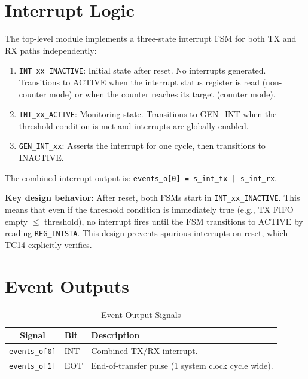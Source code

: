 \section{Interrupt Logic}

The top-level module implements a three-state interrupt FSM for both TX and RX paths independently:
\begin{enumerate}[leftmargin=2em]
  \item \texttt{INT\_xx\_INACTIVE}: Initial state after reset. No interrupts generated. Transitions
        to ACTIVE when the interrupt status register is read (non-counter mode) or when the
        counter reaches its target (counter mode).
  \item \texttt{INT\_xx\_ACTIVE}: Monitoring state. Transitions to GEN\_INT when the threshold
        condition is met and interrupts are globally enabled.
  \item \texttt{GEN\_INT\_xx}: Asserts the interrupt for one cycle, then transitions to INACTIVE.
\end{enumerate}

The combined interrupt output is: \texttt{events\_o[0] = s\_int\_tx | s\_int\_rx}.

\textbf{Key design behavior:} After reset, both FSMs start in \texttt{INT\_xx\_INACTIVE}.
This means that even if the threshold condition is immediately true (e.g., TX FIFO empty $\leq$
threshold), no interrupt fires until the FSM transitions to ACTIVE by reading \texttt{REG\_INTSTA}.
This design prevents spurious interrupts on reset, which TC14 explicitly verifies.

\section{Event Outputs}

\begin{table}[H]
\centering
\caption{Event Output Signals}
\label{tab:events}
\begin{tabularx}{\textwidth}{@{}clX@{}}
\toprule
\textbf{Signal} & \textbf{Bit} & \textbf{Description} \\
\midrule
\texttt{events\_o[0]} & INT & Combined TX/RX interrupt. \\
\texttt{events\_o[1]} & EOT & End-of-transfer pulse (1 system clock cycle wide). \\
\bottomrule
\end{tabularx}
\end{table}
